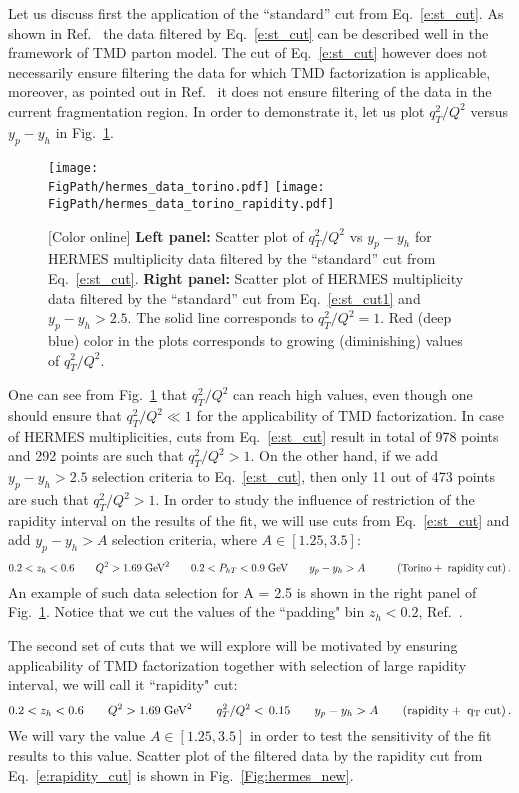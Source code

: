 \documentclass[final,3p,times,onecolumn,sort&compress,hidelinks]{elsarticle}
\newcommand*{\FigPath}{../Figs/}%
\begin{document}
Let us discuss first the application of the ``standard'' cut from Eq.~\eqref{e:st_cut}. As shown in Ref.~\cite{Anselmino:2013lza} the data filtered by Eq.~\eqref{e:st_cut} can be described well in the framework of TMD parton model. The cut of Eq.~\eqref{e:st_cut} however does not necessarily ensure filtering the data for which TMD factorization is applicable, moreover, as pointed out in Ref.~\cite{Boglione:2016bph} it does not ensure filtering of the data in the current fragmentation region. In order to demonstrate it, let us plot $q_T^2/Q^2$ versus $y_p-y_h$ in Fig.~\ref{Fig:hermes_torino}.
\begin{figure}[htb!]
\centering
\texttt{[image: \\FigPath/hermes\_data\_torino.pdf]}
\texttt{[image: \\FigPath/hermes\_data\_torino\_rapidity.pdf]}
\caption{\label{Fig:hermes_torino}
[Color online] {\bf Left panel:} Scatter plot of $q_T^2/Q^2$ vs $y_p-y_h$ for HERMES multiplicity data filtered by the ``standard'' cut from Eq.~\eqref{e:st_cut}. {\bf Right panel:} 
Scatter plot of HERMES multiplicity data filtered by the ``standard'' cut from Eq.~\eqref{e:st_cut1} and $y_p-y_h>2.5$. The solid line corresponds to $q_T^2/Q^2=1$. Red (deep blue) color in the plots corresponds to growing (diminishing) values of $q_T^2/Q^2$.
}
\end{figure}
One can see from Fig.~\ref{Fig:hermes_torino} that $q_T^2/Q^2$ can reach high values, even though one should ensure that $q_T^2/Q^2\ll 1$ for the applicability of TMD factorization. In case of HERMES multiplicities, cuts from Eq.~\eqref{e:st_cut} result in total of 978 points and 292 points are such that $q_T^2/Q^2>1$. On the other hand, if we add $y_p-y_h>2.5$ selection criteria to Eq.~\eqref{e:st_cut}, then only 11 out of 473 points are such that $q_T^2/Q^2>1$. In order to study the influence of restriction of the rapidity interval on the results of the fit, we will use cuts from Eq.~\eqref{e:st_cut} and add $y_p-y_h>A$ selection criteria, where $A \in[1.25, 3.5]$:
\begin{equation}
0.2 < z_h < 0.6 \quad\quad Q^2 > 1.69 \; \textrm{GeV}^2  
\quad\quad 0.2 < P_{hT} < 0.9 \; \textrm{GeV} \quad\quad y_p-y_h > A  \quad\quad\quad{\rm (Torino+\;rapidity\;cut)}\,.\label{e:st_cut1}
\end{equation}
An example of such data selection for A = 2.5 is shown in the right panel of Fig.~\ref{Fig:hermes_torino}. Notice that we cut the values of the ``padding" bin $z_h<0.2$, Ref.~\cite{schnell}.

The second set of cuts that we will explore will be motivated by ensuring applicability of TMD factorization together with selection of large rapidity interval, we will call it ``rapidity" cut:
\begin{equation}
0.2 < z_h < 0.6 \quad\quad Q^2 > 1.69 \; \textrm{GeV}^2  
\quad\quad  q_T^2/Q^2 < \, 0.15   \quad\quad y_p-y_h > A \quad\quad{\rm (rapidity+\;q_T\;cut)}\,.\label{e:rapidity_cut}
\end{equation}
 We will vary the value $A \in[1.25, 3.5]$ in order to test the sensitivity of the fit results to this value. Scatter plot of the filtered data by the rapidity cut from Eq.~\eqref{e:rapidity_cut} is shown in Fig.~\ref{Fig:hermes_new}.
\end{document}
